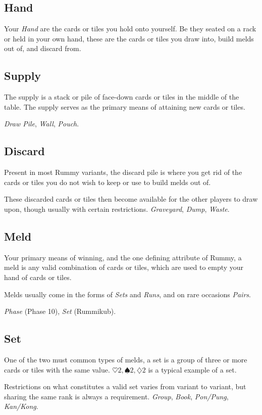 \subsection{Hand}
Your \textit{Hand} are the cards or tiles you hold onto yourself. Be they seated on a rack or held in your own hand, these are the cards or tiles you draw into, build melds out of, and discard from.

\subsection{Supply}
The supply is a stack or pile of face-down cards or tiles in the middle of the table.
The supply serves as the primary means of attaining new cards or tiles.

\otherNames \textit{Draw Pile}, \textit{Wall}, \textit{Pouch}.
\subsection{Discard}
Present in most Rummy variants, the discard pile is where you get rid of the cards or tiles you do not wish to keep or use to build melds out of.

These discarded cards or tiles then become available for the other players to draw upon, though usually with certain restrictions.
\otherNames \textit{Graveyard}, \textit{Dump}, \textit{Waste}.
\subsection{Meld}
Your primary means of winning, and the one defining attribute of Rummy, a meld is any valid combination of cards or tiles, which are used to empty your hand of cards or tiles.

Melds usually come in the forms of \textit{Sets} and \textit{Runs}, and on rare occasions \textit{Pairs}.

\otherNames \textit{Phase} (Phase 10), \textit{Set} (Rummikub).
\subsection{Set}
One of the two must common types of melds, a set is a group of three or more cards or tiles with the same value. $\heartsuit 2, \spadesuit 2, \diamondsuit 2$ is a typical example of a set.

Restrictions on what constitutes a valid set varies from variant to variant, but sharing the same rank is always a requirement.
\otherNames \textit{Group}, \textit{Book}, \textit{Pon/Pung}, \textit{Kan/Kong}.
